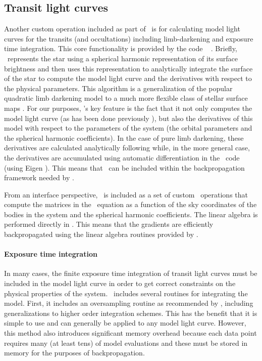\documentclass[modern]{aastex62}
\begin{document}
\subsection{Transit light curves}

Another custom operation included as part of \exoplanet\ is for calculating model light curves for the transits (and occultations) including limb-darkening and exposure time integration.
This core functionality is provided by the code \starry\ \citep{Luger:2019} .
Briefly, \starry\ represents the star using a spherical harmonic representation of its surface brightness and then uses this representation to analytically integrate the surface of the star to compute the model light curve and the derivatives with respect to the physical parameters.
This algorithm is a generalization of the popular quadratic limb darkening model \citep{Mandel:2002} to a much more flexible class of stellar surface maps .
For our purposes, \starry's key feature is the fact that it not only computes the model light curve (as has been done previously ), but also the derivatives of this model with respect to the parameters of the system (the orbital parameters and the spherical harmonic coefficients).
In the case of pure limb darkening, these derivatives are calculated analytically following  while, in the more general case, the derivatives are accumulated using automatic differentiation in the \cpp\ code (using Eigen ).
This means that \starry\ can be included within the backpropagation framework needed by \exoplanet.

From an interface perspective, \starry\ is included as a set of custom \theano\ operations that compute the matrices in the \starry\ equation as a function of the sky coordinates of the bodies in the system and the spherical harmonic coefficients.
The linear algebra is performed directly in \theano.
This means that the gradients are efficiently backpropagated using the linear algebra routines provided by \theano.

\paragraph{Exposure time integration}
In many cases, the finite exposure time integration of transit light curves must be included in the model light curve in order to get correct constraints on the physical properties of the system.
\exoplanet\ includes several routines for integrating the model.
First, it includes an oversampling routine as recommended by , including generalizations to higher order integration schemes.
This has the benefit that it is simple to use and can generally be applied to any model light curve.
However, this method also introduces significant memory overhead because each data point requires many (at least tens) of model evaluations and these must be stored in memory for the purposes of backpropagation.
\end{document}
